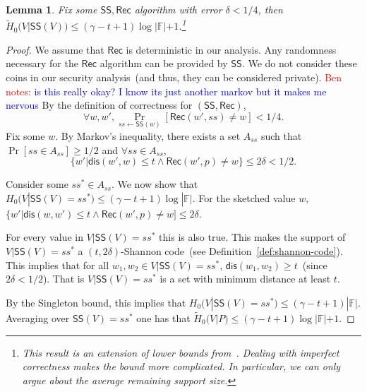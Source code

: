 \documentclass[11pt]{article}
\newcommand{\defref}[1]{\mbox{Definition~\ref{#1}}}
\newcommand{\class}[1]{{\ensuremath{\mathsf{#1}}}}
\newcommand{\sketch}{\ensuremath{\class{SS}}\xspace}
\newcommand{\rec}{\ensuremath{\class{Rec}}\xspace}
\newcommand{\dis}{\ensuremath{\mathsf{dis}}}
\newtheorem{lemma}[theorem]{Lemma}
\newcommand{\authnote}[2]{{\textcolor{red}{\textsf{#1 notes: }\textcolor{blue}{ #2}}\marginpar{\textcolor{red}{\textbf{!!!!!}}}}}
\newcommand{\authnote}[2]{}
\newcommand{\bnote}[1]{{\authnote{Ben}{#1}}}
\begin{document}
\begin{lemma}
\label{lem:secure sketch entropy loss}
Fix some $\sketch, \rec$ algorithm with error $\delta < 1/4$, then $\tilde{H}_0(V | \sketch(V)) \le (\gamma-t+1)\log |\mathbb{F}|+1$.\footnote{This result is an extension of lower bounds from~\cite[Appendix C]{DBLP:journals/siamcomp/DodisORS08}.  Dealing with imperfect correctness makes the bound more complicated.  In particular, we can only argue about the average remaining support size.}
\end{lemma}
\begin{proof}
We assume that $\rec$ is deterministic in our analysis.  Any randomness necessary for the \rec algorithm can be provided by \sketch.  We do not consider these coins in our security analysis~(and thus, they can be considered private).  \bnote{is this really okay?  I know its just another markov but it makes me nervous}
By the definition of correctness for $(\sketch, \rec)$, 
\[
\forall w, w', \Pr_{ss\leftarrow \sketch(w)} [\rec(w', ss) \neq w] < 1/4.
\]
Fix some $w$.  
By Markov's inequality, there exists a set $A_{ss}$ such that $\Pr[ss\in A_{ss}]\ge 1/2$ and $\forall ss\in A_{ss}$, 
\[
\{w' | \dis (w', w)\le t \wedge \rec(w', p) \neq w\}\le 2\delta < 1/2.\]

Consider some $ss^*\in A_{ss}$.  We now show that $H_0(V | \sketch(V) = ss^*) \le (\gamma-t+1)\log |\mathbb{F}|$.  For the sketched value $w$, $\{w' | \dis(w, w') \le t \wedge \rec(w', p) \neq w] \le 2\delta$.  

For every value in $V|\sketch(V) = ss^*$ this is also true.  This makes the support of $V|\sketch(V)=ss^*$ a $(t, 2\delta)$-Shannon code~(see \defref{def:shannon-code}).  This implies that for all $w_1, w_2 \in V|\sketch(V)=ss^*$, $\dis(w_1, w_2)\ge t$~(since $2\delta< 1/2$).  That is $V|\sketch(V)=ss^*$ is a set with minimum distance at least $t$.  

By the Singleton bound, this implies that $H_0(V |\sketch(V)=ss^*) \le (\gamma -t+1 )|\mathbb{F}|$.  Averaging over $\sketch(V)=ss^*$ one has that $\tilde{H}_0(V|P) \le (\gamma -t +1) \log|\mathbb{F}| +1$.
\end{proof}
\end{document}
